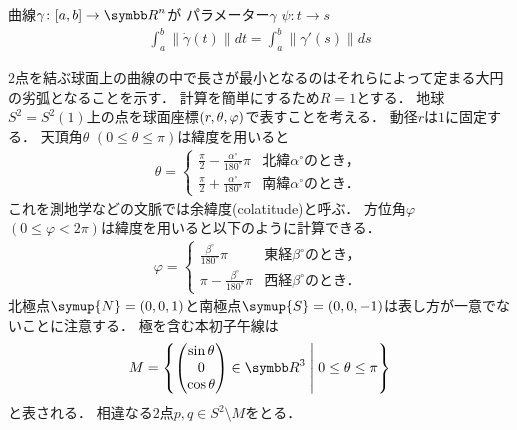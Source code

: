 \documentclass{ltjsbook}
\begin{document}
\begin{thmbox}
\begin{proposition}
曲線\(\gamma\colon [a, b] \to {\Real}^n\)が
パラメーター\(\gamma\)
\(\psi\colon t \to s\)
\begin{align*}
    \int_a^b \lVert \dot{\gamma}(t) \rVert dt
    = \int_a^b \lVert \gamma'(s) \rVert ds
\end{align*}
\end{proposition}
\end{thmbox}

\(2\)点を結ぶ球面上の曲線の中で長さが最小となるのはそれらによって定まる大円の劣弧となることを示す．
計算を簡単にするため\(R = 1\)とする．
地球\(S^2 = S^2(1)\)上の点を球面座標\((r, \theta, \varphi)\)で表すことを考える．
動径\(r\)は\(1\)に固定する．
天頂角\(\theta\) \((0 \leq \theta \leq \pi)\)は緯度を用いると
\begin{align*}
    \theta = \begin{cases}
        \displaystyle
        \frac{\pi}{2} - \frac{\alpha^\circ}{180^\circ} \pi
        & \text{北緯\(\alpha^\circ\)のとき，} \\[10pt]
        \displaystyle
        \frac{\pi}{2} + \frac{\alpha^\circ}{180^\circ} \pi
        & \text{南緯\(\alpha^\circ\)のとき．}
    \end{cases}
\end{align*}
これを測地学などの文脈では余緯度(colatitude)と呼ぶ．
方位角\(\varphi\) \((0 \leq \varphi < 2\pi)\)は緯度を用いると以下のように計算できる．
\begin{align*}
    \varphi = \begin{cases}
        \displaystyle
        \frac{\beta^\circ}{180^\circ} \pi
        & \text{東経\(\beta^\circ\)のとき，} \\[10pt]
        \displaystyle
        \pi - \frac{\beta^\circ}{180^\circ} \pi
        & \text{西経\(\beta^\circ\)のとき．}
    \end{cases}
\end{align*}
北極点\(\symup{N} = (0, 0, 1)\)と南極点\(\symup{S} = (0, 0, -1)\)は表し方が一意でないことに注意する．
極を含む本初子午線は
\begin{align*}
    M = \left\{\begin{pmatrix} \sin \theta \\ 0 \\ \cos \theta \end{pmatrix} \in {\Real}^3 \relmiddle{|} 0 \leq \theta \leq \pi\right\}
\end{align*}
と表される．
相違なる\(2\)点\(p, q \in S^2 \setminus M\)をとる．
\end{document}
